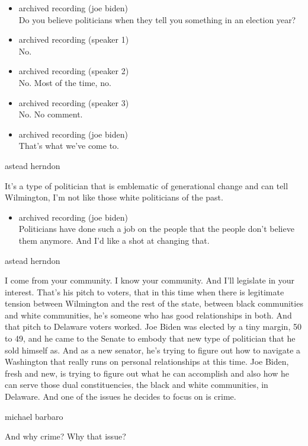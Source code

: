 \begin{itemize}
\item
  archived recording (joe biden)\\
  Do you believe politicians when they tell you something in an election
  year?
\item
  archived recording (speaker 1)\\
  No.
\item
  archived recording (speaker 2)\\
  No. Most of the time, no.
\item
  archived recording (speaker 3)\\
  No. No comment.
\item
  archived recording (joe biden)\\
  That's what we've come to.
\end{itemize}

astead herndon

It's a type of politician that is emblematic of generational change and
can tell Wilmington, I'm not like those white politicians of the past.

\begin{itemize}
\tightlist
\item
  archived recording (joe biden)\\
  Politicians have done such a job on the people that the people don't
  believe them anymore. And I'd like a shot at changing that.
\end{itemize}

astead herndon

I come from your community. I know your community. And I'll legislate in
your interest. That's his pitch to voters, that in this time when there
is legitimate tension between Wilmington and the rest of the state,
between black communities and white communities, he's someone who has
good relationships in both. And that pitch to Delaware voters worked.
Joe Biden was elected by a tiny margin, 50 to 49, and he came to the
Senate to embody that new type of politician that he sold himself as.
And as a new senator, he's trying to figure out how to navigate a
Washington that really runs on personal relationships at this time. Joe
Biden, fresh and new, is trying to figure out what he can accomplish and
also how he can serve those dual constituencies, the black and white
communities, in Delaware. And one of the issues he decides to focus on
is crime.

michael barbaro

And why crime? Why that issue?

